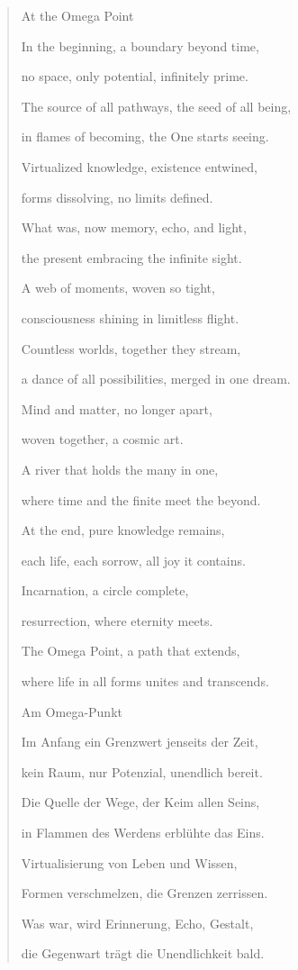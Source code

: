 \documentclass[
  ngerman,
]{article}
\begin{document}
\begin{quote}
At the Omega Point

In the beginning, a boundary beyond time,

no space, only potential, infinitely prime.

The source of all pathways, the seed of all being,

in flames of becoming, the One starts seeing.

Virtualized knowledge, existence entwined,

forms dissolving, no limits defined.

What was, now memory, echo, and light,

the present embracing the infinite sight.

A web of moments, woven so tight,

consciousness shining in limitless flight.

Countless worlds, together they stream,

a dance of all possibilities, merged in one dream.

Mind and matter, no longer apart,

woven together, a cosmic art.

A river that holds the many in one,

where time and the finite meet the beyond.

At the end, pure knowledge remains,

each life, each sorrow, all joy it contains.

Incarnation, a circle complete,

resurrection, where eternity meets.

The Omega Point, a path that extends,

where life in all forms unites and transcends.

Am Omega-Punkt

Im Anfang ein Grenzwert jenseits der Zeit,

kein Raum, nur Potenzial, unendlich bereit.

Die Quelle der Wege, der Keim allen Seins,

in Flammen des Werdens erblühte das Eins.

Virtualisierung von Leben und Wissen,

Formen verschmelzen, die Grenzen zerrissen.

Was war, wird Erinnerung, Echo, Gestalt,

die Gegenwart trägt die Unendlichkeit bald.


\end{quote}
\end{document}
